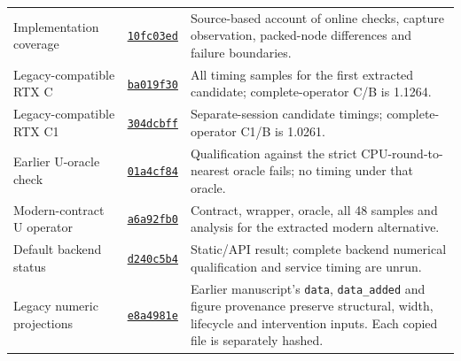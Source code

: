 \begin{longtable}{@{}p{3.2cm}p{2.35cm}p{10.0cm}@{}}
Implementation coverage & \href{https://github.com/leecdiang/HeteroSpec/blob/10fc03ed59e260a290a8ca8d6670d30d50f08118/benchmarks/jpdc_closeout_20261113/GUARANTEES.zh.md}{\texttt{10fc03ed}} & Source-based account of online checks, capture observation, packed-node differences and failure boundaries.\\
Legacy-compatible RTX C & \href{https://github.com/leecdiang/HeteroSpec/blob/ba019f30522352c87cac2cc527082ecc6c73ed97/benchmarks/rtx223_e08_q8_20261113/numeric-v1/TIMING_SAMPLES.csv}{\texttt{ba019f30}} & All timing samples for the first extracted candidate; complete-operator C/B is 1.1264.\\
Legacy-compatible RTX C1 & \href{https://github.com/leecdiang/HeteroSpec/blob/304dcbff6d17461237774464c67ce8cb0ed60189/benchmarks/rtx223_e09_c1_20261113/ALL_SAMPLES.csv}{\texttt{304dcbff}} & Separate-session candidate timings; complete-operator C1/B is 1.0261.\\
Earlier U-oracle check & \href{https://github.com/leecdiang/HeteroSpec/blob/01a4cf847bfc8340321564c66132680d4131bf0d/benchmarks/rtx223_e10_fewrow_20261113/RESULT.json}{\texttt{01a4cf84}} & Qualification against the strict CPU-round-to-nearest oracle fails; no timing under that oracle.\\
Modern-contract U operator & \href{https://github.com/leecdiang/HeteroSpec/tree/a6a92fb08678696fdaefa4904f942237b4d3c84f/benchmarks/rtx223_e11_u_contract_20261113}{\texttt{a6a92fb0}} & Contract, wrapper, oracle, all 48 samples and analysis for the extracted modern alternative.\\
Default backend status & \href{https://github.com/leecdiang/HeteroSpec/blob/d240c5b43a763d5b02b5a53169b07f8e8af71a6c/benchmarks/rtx223_e12_backend_closure_20261113/RESULT.json}{\texttt{d240c5b4}} & Static/API result; complete backend numerical qualification and service timing are unrun.\\
Legacy numeric projections & \href{https://github.com/leecdiang/HeteroSpec/tree/e8a4981ef7db8f05cff7144fd4edc6e5a4109343/papers/reference_compatible/20261111_tpds_mainline_rewrite}{\texttt{e8a4981e}} & Earlier manuscript's \texttt{data}, \texttt{data\_added} and figure provenance preserve structural, width, lifecycle and intervention inputs. Each copied file is separately hashed.\\
\end{longtable}
\normalsize

